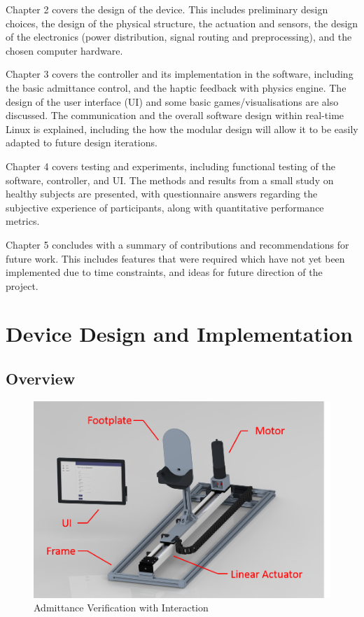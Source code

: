 \documentclass[12pt]{report}
\begin{document}
Chapter 2 covers the design of the device. This includes preliminary design choices, the design of the physical structure, the actuation and sensors, the design of the electronics (power distribution, signal routing and preprocessing), and the chosen computer hardware. 

Chapter 3 covers the controller and its implementation in the software, including the basic admittance control, and the haptic feedback with physics engine. The design of the user interface (UI) and some basic games/visualisations are also discussed. The communication and the overall software design within real-time Linux is explained, including the how the modular design will allow it to be easily adapted to future design iterations. 

Chapter 4 covers testing and experiments, including functional testing of the software, controller, and UI. The methods and results from a small study on healthy subjects are presented, with questionnaire answers regarding the subjective experience of participants, along with quantitative performance metrics. 

Chapter 5 concludes with a summary of contributions and recommendations for future work. This includes features that were required which have not yet been implemented due to time constraints, and ideas for future direction of the project. 

\chapter{Device Design and Implementation}
	\section{Overview}

	\begin{figure}[t] 
		\centering
		\includegraphics[width=0.75\linewidth]{Robot_labeled}
		\caption{Admittance Verification with Interaction}
		\label{fig:VerInt}
	\end{figure}
	
\end{document}
